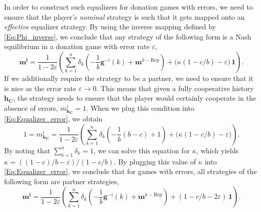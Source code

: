 \documentclass[9pt,twoside,lineno]{pnas-new}
\theoremstyle{plainCl1}
\theoremstyle{plainCl2}
\begin{document}
In order to construct such equalizers for donation games with errors, we need to ensure that the player's {\it nominal} strategy is such that it gets mapped onto an {\it effective} equalizer strategy. 
By using the inverse mapping defined by \eqref{Eq:Phi_inverse}, we conclude that any strategy of the following form is a Nash equilibrium in a donation game with error rate $\varepsilon$, 
\begin{equation} \label{Eq:Equalizer_error}
\mathbf{m^{i}} =\frac{1}{1-2\varepsilon}\left( \sum_{k=1}^n \delta_k \left(-\frac{1}{b}\mathbf{g}^{-i}(k) +\mathbf{m}^{k-\text{Rep}}\right) + \big(\kappa(1\!-\!c/b)-\varepsilon\big)\, \mathbf{1}\right).
\end{equation}
If we additionally require the strategy to be a partner, we need to ensure that it is nice as the error rate $\varepsilon\to 0$. 
This means that given a fully cooperative history $\mathbf{h_\mathbf{C}}$, the strategy needs to ensure that the player would certainly cooperate in the absence of errors, $m^i_\mathbf{h_C}\!=\!1$. When we plug this condition into \eqref{Eq:Equalizer_error}, we obtain
\begin{equation}
1 = m^{i}_{\mathbf{h_C}} =\frac{1}{1-2\varepsilon}\left( \sum_{k=1}^n \delta_k \left(-\frac{1}{b}(b\!-\!c) +1\right) + \big(\kappa(1\!-\!c/b)-\varepsilon\big)\right).
\end{equation}
By noting that $\sum_{k=1}^n \delta_k\!=\!1$, we can solve this equation for $\kappa$, which yields $\kappa\!=\!((1\!-\!c)/b\!-\!\varepsilon)/(1\!-\!c/b)$. 
By plugging this value of $\kappa$ into \eqref{Eq:Equalizer_error}, we conclude that for games with errors, all strategies of the following form are partner strategies,
\begin{equation} \label{Eq:Partner_error}
\mathbf{m^{i}} =\frac{1}{1-2\varepsilon}\left( \sum_{k=1}^n \delta_k \left(-\frac{1}{b}\mathbf{g}^{-i}(k) +\mathbf{m}^{k-\text{Rep}}\right) + (1\!-\!c/b\!-\!2\varepsilon)\, \mathbf{1}\right).
\end{equation}

~
\end{document}
